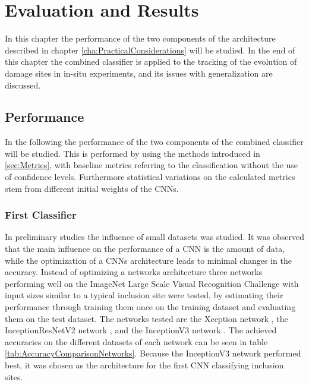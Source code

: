 
\chapter{Evaluation and Results} %

\label{Performance} %

In this chapter the performance of the two components of the architecture described in chapter \ref{cha:PracticalConsiderations} will be studied. In the end of this chapter the combined classifier is applied to the tracking of the evolution of damage sites in in-situ experiments, and its issues with generalization are discussed.

\section{Performance}
In the following the performance of the two components of the combined classifier will be studied. This is performed by using the methods introduced in \ref{sec:Metrics}, with baseline metrics referring to the classification without the use of confidence levels. Furthermore statistical variations on the calculated metrics stem from different initial weights of the CNNs. 

\subsection{First Classifier}
\label{sec:FirstClassifier}

In preliminary studies the influence of small datasets was studied. It was observed that the main influence on the performance of a CNN is the amount of data, while the optimization of a CNNs architecture leads to minimal changes in the accuracy. Instead of optimizing a networks architecture three networks performing well on the ImageNet Large Scale Visual Recognition Challenge \cite{imagenet_cvpr09} with input sizes similar to a typical inclusion site were tested, by estimating their performance through training them once on the training dataset and evaluating them on the test dataset. The networks tested are the Xception network \cite{Chollet2016}, the InceptionResNetV2 network \cite{Szegedy2016}, and the InceptionV3 network \cite{Szegedy2015}. The achieved accuracies on the different datasets of each network can be seen in table \ref{tab:AccuracyComparisonNetworks}. Because the InceptionV3 network performed best, it was chosen as the architecture for the first CNN classifying inclusion sites. \\


